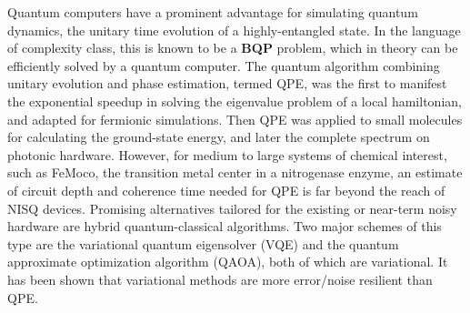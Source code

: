 \documentclass[journal=jctcce,manuscript=article]{achemso}
\begin{document}
Quantum computers have a prominent advantage for simulating quantum dynamics, the unitary time evolution of a highly-entangled state.\cite{Kassal:2008bf} In the language of complexity class, this is known to be a \textbf{BQP} problem,\cite{Cao:2019jn,Kassal:2008bf} which in theory can be efficiently solved by a quantum computer.
The quantum algorithm combining unitary evolution and phase estimation, termed QPE, was the first to manifest the exponential speedup in solving the eigenvalue problem of a local hamiltonian,\cite{Abrams:1997ha,Abrams:1999ur} and adapted for fermionic simulations.\cite{Ortiz:2001jn} 
Then QPE was applied to small molecules for calculating the ground-state energy,\cite{AspuruGuzik:dj} and later the complete spectrum on photonic hardware.\cite{Lanyon:2010jf}
However, for medium to large systems of chemical interest, such as FeMoco, the transition metal center in a nitrogenase enzyme, an estimate of circuit depth and coherence time needed for QPE is far beyond the reach of NISQ devices.\cite{Reiher:2017cv}
Promising alternatives tailored for the existing or near-term noisy hardware are hybrid quantum-classical algorithms. Two major schemes of this type are the variational quantum eigensolver (VQE)\cite{Peruzzo:2014kc,Yung:2014iv,McClean:2015bs} and the quantum approximate optimization algorithm (QAOA),\cite{Farhi:2014wl} both of which are variational. It has been shown that variational methods are more error/noise resilient than QPE.\cite{McClean:2017ct,Cao:2019jn}
\end{document}
